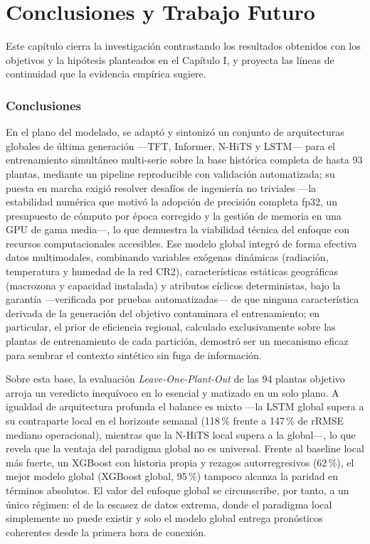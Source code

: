 \section{Conclusiones y Trabajo Futuro}

Este capítulo cierra la investigación contrastando los resultados obtenidos con los objetivos y la hipótesis planteados en el Capítulo I, y proyecta las líneas de continuidad que la evidencia empírica sugiere.

\subsubsection{Conclusiones}

En el plano del modelado, se adaptó y sintonizó un conjunto de arquitecturas globales de última generación —TFT, Informer, N-HiTS y LSTM— para el entrenamiento simultáneo multi-serie sobre la base histórica completa de hasta 93 plantas, mediante un pipeline reproducible con validación automatizada; su puesta en marcha exigió resolver desafíos de ingeniería no triviales —la estabilidad numérica que motivó la adopción de precisión completa fp32, un presupuesto de cómputo por época corregido y la gestión de memoria en una GPU de gama media—, lo que demuestra la viabilidad técnica del enfoque con recursos computacionales accesibles. Ese modelo global integró de forma efectiva datos multimodales, combinando variables exógenas dinámicas (radiación, temperatura y humedad de la red CR2), características estáticas geográficas (macrozona y capacidad instalada) y atributos cíclicos deterministas, bajo la garantía —verificada por pruebas automatizadas— de que ninguna característica derivada de la generación del objetivo contaminara el entrenamiento; en particular, el prior de eficiencia regional, calculado exclusivamente sobre las plantas de entrenamiento de cada partición, demostró ser un mecanismo eficaz para sembrar el contexto sintético sin fuga de información.

Sobre esta base, la evaluación \textit{Leave-One-Plant-Out} de las 94 plantas objetivo arroja un veredicto inequívoco en lo esencial y matizado en un solo plano. A igualdad de arquitectura profunda el balance es mixto —la LSTM global supera a su contraparte local en el horizonte semanal (118\,\% frente a 147\,\% de rRMSE mediano operacional), mientras que la N-HiTS local supera a la global—, lo que revela que la ventaja del paradigma global no es universal. Frente al baseline local más fuerte, un XGBoost con historia propia y rezagos autorregresivos (62\,\%), el mejor modelo global (XGBoost global, 95\,\%) tampoco alcanza la paridad en términos absolutos. El valor del enfoque global se circunscribe, por tanto, a un único régimen: el de la escasez de datos extrema, donde el paradigma local simplemente no puede existir y solo el modelo global entrega pronósticos coherentes desde la primera hora de conexión.

